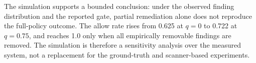 The simulation supports a bounded conclusion: under the observed finding distribution and the reported gate, partial remediation alone does not reproduce the full-policy outcome. The allow rate rises from 0.625 at $q=0$ to 0.722 at $q=0.75$, and reaches 1.0 only when all empirically removable findings are removed. The simulation is therefore a sensitivity analysis over the measured system, not a replacement for the ground-truth and scanner-based experiments.
